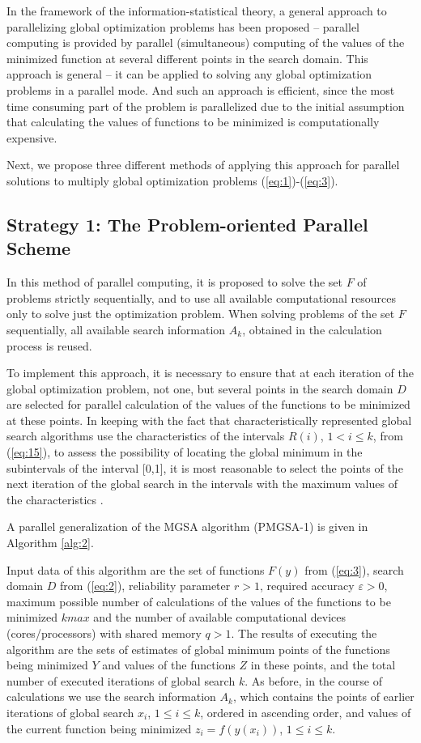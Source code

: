 \documentclass[review]{elsarticle}
\begin{document}
In the framework of the information-statistical theory, a general approach to parallelizing global optimization problems has been proposed -- parallel computing is provided by parallel (simultaneous) computing of the values of the minimized function at several different points in the search domain. This approach is general -- it can be applied to solving any global optimization problems in a parallel mode. And such an approach is efficient, since the most time consuming part of the problem is parallelized due to the initial assumption that calculating the values of functions to be minimized is computationally expensive.

Next, we propose three different methods of applying this approach for parallel solutions to multiply global optimization problems (\ref{eq:1})-(\ref{eq:3}).

\subsection{Strategy 1: The Problem-oriented Parallel Scheme} \label{subsec:1}

In this method of parallel computing, it is proposed to solve the set $F$ of problems strictly sequentially, and to use all available computational resources only to solve just the optimization problem. When solving problems of the set $F$ sequentially, all available search information $A_k$, obtained in the calculation process is reused. 

To implement this approach, it is necessary to ensure that at each iteration of the global optimization problem, not one, but several points in the search domain $D$ are selected for parallel calculation of the values of the functions to be minimized at these points. In keeping with the fact that characteristically represented global search algorithms use the characteristics of the intervals $R(i)$, $1 < i \leq k$, from (\ref{eq:15}), to assess the possibility of locating the global minimum in the subintervals of the interval [0,1], it is most reasonable to select the points of the next iteration of the global search in the intervals with the maximum values of the characteristics \cite{c6}.

A parallel generalization of the MGSA algorithm (PMGSA-1) is given in Algorithm \ref{alg:2}.

Input data of this algorithm are the set of functions $F(y)$ from (\ref{eq:3}), search domain $D$ from (\ref{eq:2}), reliability parameter $r>1$, required accuracy $\varepsilon > 0$, maximum possible number of calculations of the values of the functions to be minimized $kmax$ and the number of available computational devices ({cores/processors}) with shared memory $q>1$. The results of executing the algorithm are the sets of estimates of global minimum points of the functions being minimized $Y$ and values of the functions $Z$ in these points, and the total number of executed iterations of global search $k$. As before, in the course of calculations we use the search information $A_k$, which contains the points of earlier iterations of global search $x_i$, $1 \leq i \leq k$, ordered in ascending order, and values of the current function being minimized $z_i=f(y(x_i))$, $1 \leq i \leq k$.
\end{document}
